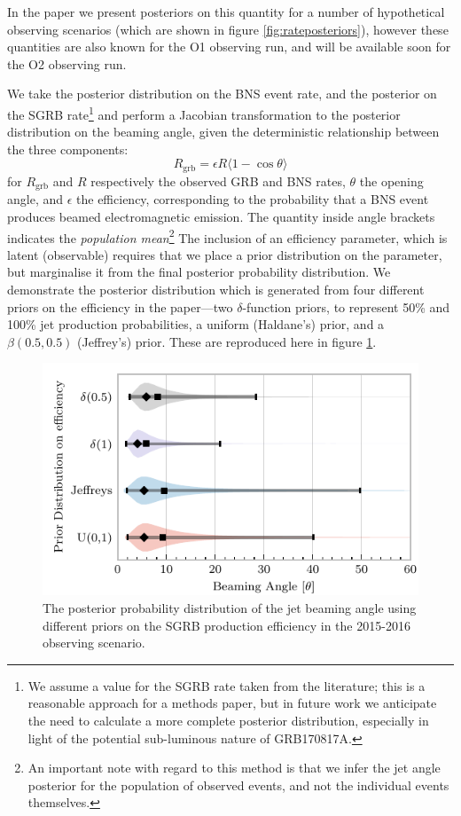 \documentclass[openleft]{kentigern}
\theoremstyle{definition}
\begin{document}
In the paper we present posteriors on this quantity for a number of
hypothetical observing scenarios (which are shown in figure
\ref{fig:rateposteriors}), however these quantities are also known for
the O1 observing run, and will be available soon for the O2 observing
run.

We take the posterior distribution on the BNS event rate, and the
posterior on the SGRB rate\footnote{We assume a value for the SGRB
  rate taken from the literature; this is a reasonable approach for a
  methods paper, but in future work we anticipate the need to
  calculate a more complete posterior distribution, especially in
  light of the potential sub-luminous nature of GRB170817A.} and
perform a Jacobian transformation to the posterior distribution on the
beaming angle, given the deterministic relationship between the three
components:
\begin{equation}
  \label{eq:sgrb-angle-from-rates}
  R_{\text{grb}} = \epsilon R \langle 1 - \cos\theta \rangle
\end{equation}
for $R_{\text{grb}}$ and $R$ respectively the observed GRB and BNS
rates, $\theta$ the opening angle, and $\epsilon$ the efficiency,
corresponding to the probability that a BNS event produces beamed
electromagnetic emission. The quantity inside angle brackets indicates
the \emph{population mean}\footnote{An important note with regard to
  this method is that we infer the jet angle posterior for the
  population of observed events, and not the individual events
  themselves.} The inclusion of an efficiency parameter, which is
latent (observable) requires that we place a prior distribution on the
parameter, but marginalise it from the final posterior probability
distribution. We demonstrate the posterior distribution which is
generated from four different priors on the efficiency in the
paper---two $\delta$-function priors, to represent 50\% and 100\% jet
production probabilities, a uniform (Haldane's) prior, and a
$\beta(0.5, 0.5)$ (Jeffrey's) prior. These are reproduced here in
figure \ref{fig:o1posterior}.

\begin{figure}
  \includegraphics{figures/sgrb/O1_beaming_posteriors_violin.pdf}
  \caption{The posterior probability distribution of the jet
    beaming angle using different priors on the SGRB production
    efficiency in the 2015-2016 observing scenario. \label{fig:o1posterior}}
  \end{figure}
\end{document}
